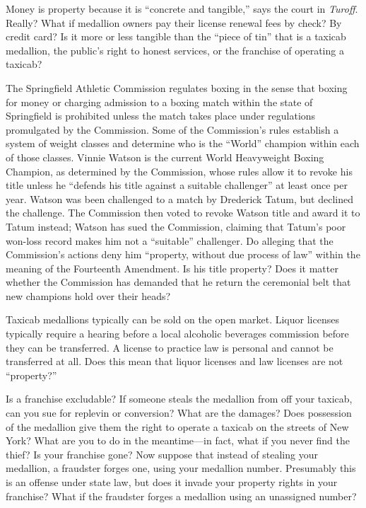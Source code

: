 \item Money is property because it is ``concrete and tangible,'' says the court
in \textit{Turoff}. Really? What if medallion owners pay their license renewal
fees by check? By credit card? Is it more or less tangible than the ``piece of
tin'' that is a taxicab medallion, the public's right to honest services, or
the franchise of operating a taxicab?

\item The Springfield Athletic Commission regulates boxing in the sense that
boxing for money or charging admission to a boxing match within the state of
Springfield is prohibited unless the match takes place under regulations
promulgated by the Commission. Some of the Commission's rules establish a
system of weight classes and determine who is the ``World'' champion within
each of those classes. Vinnie Watson is the current World Heavyweight Boxing
Champion, as determined by the Commission, whose rules allow it to revoke his
title unless he ``defends his title against a suitable challenger'' at least
once per year. Watson was been challenged to a match by Drederick Tatum, but
declined the challenge. The Commission then voted to revoke Watson title and
award it to Tatum instead; Watson has sued the Commission, claiming that
Tatum's poor won-loss record makes him not a ``suitable'' challenger. Do
alleging that the Commission's actions deny him ``property, without due process
of law'' within the meaning of the Fourteenth Amendment. Is his title property?
Does it matter whether the Commission has demanded that he return the
ceremonial belt that new champions hold over their heads?

\item Taxicab medallions typically can be sold on the open market. Liquor
licenses typically require a hearing before a local alcoholic beverages
commission before they can be transferred. A license to practice law is
personal and cannot be transferred at all. Does this mean that liquor licenses
and law licenses are not ``property?''

\item Is a franchise excludable? If someone steals the medallion from off your
taxicab, can you sue for replevin or conversion? What are the damages? Does
possession of the medallion give them the right to operate a taxicab on the
streets of New York? What are you to do in the meantime---in fact, what if you
never find the thief? Is your franchise gone? Now suppose that instead of
stealing your medallion, a fraudster forges one, using your medallion number.
Presumably this is an offense under state law, but does it invade your property
rights in your franchise? What if the fraudster forges a medallion using an
unassigned number? 

